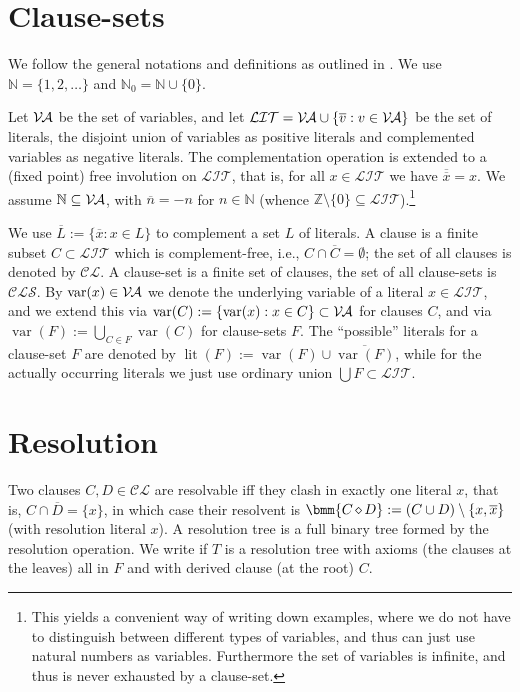\documentclass{report}
\newcommand{\set}[1]{\{ #1 \}}
\newcommand{\ol}{\overline}
\newcommand{\es}{\emptyset}
\newcommand{\sm}{\setminus}
\newcommand{\bc}{\bigcup}
\newcommand{\sse}{\subseteq}
\newcommand{\mc}{\mathcal}
\newcommand{\ZZ}{\mathbb{Z}}
\newcommand{\NN}{\mathbb{N}}
\newcommand{\NNZ}{\NN_0}
\newcommand{\Va}{\mc{V\hspace{-0.1em}A}}
\newcommand{\Lit}{\mc{LIT}}
\newcommand{\Cl}{\mc{CL}}
\newcommand{\Cls}{\mc{CLS}}
\DeclareMathOperator{\lit}{lit}
\DeclareMathOperator{\var}{var}
\DeclareMathOperator{\res}{\diamond} %
\begin{document}
\section{Clause-sets}
\label{clause-sets}

We follow the general notations and definitions as outlined in \cite{Kullmann2007HandbuchMU}. We use $\NN = \set{1,2,\dots}$ and $\NNZ = \NN \cup \set{0}$.

Let $\Va$ be the set of variables, and let $\Lit = \Va \cup \set{\ol{v} : v \in \Va}$ be the set of literals, the disjoint union of variables as positive literals and complemented variables as negative literals. The complementation operation is extended to a (fixed point) free involution on $\Lit$, that is, for all $x \in \Lit$ we have $\ol{\ol{x}} = x$. We assume $\NN \sse \Va$, with $\ol{n} = -n$ for $n \in \NN$ (whence $\ZZ \sm \set{0} \sse \Lit$).\footnote{This yields a convenient way of writing down examples, where we do not have to distinguish between different types of variables, and thus can just use natural numbers as variables. Furthermore the set of variables is infinite, and thus is never exhausted by a clause-set.}

We use $\ol{L} := \set{\ol{x} : x \in L}$ to complement a set $L$ of literals. A clause is a finite subset $C \subset \Lit$ which is complement-free, i.e., $C \cap \ol{C} = \es$; the set of all clauses is denoted by $\Cl$. A clause-set is a finite set of clauses, the set of all clause-sets is $\Cls$. By $\var(x) \in \Va$ we denote the underlying variable of a literal $x \in \Lit$, and we extend this via $\var(C) := \set{\var(x) : x \in C} \subset \Va$ for clauses $C$, and via $\var(F) := \bc_{C \in F} \var(C)$ for clause-sets $F$. The ``possible'' literals for a clause-set $F$ are denoted by $\lit(F) := \var(F) \cup \ol{\var(F)}$, while for the actually occurring literals we just use ordinary union $\bc F \subset \Lit$.


\section{Resolution}
\label{sec:Resolution}

Two clauses $C, D \in \Cl$ are resolvable iff they clash in exactly one literal $x$, that is, $C \cap \ol{D} = \set{x}$, in which case their resolvent is $\bmm{C \res D} := (C \cup D) \sm \set{x,\ol{x}}$ (with resolution literal $x$). A resolution tree is a full binary tree formed by the resolution operation. We write  if $T$ is a resolution tree with axioms (the clauses at the leaves) all in $F$ and with derived clause (at the root) $C$.
\end{document}
